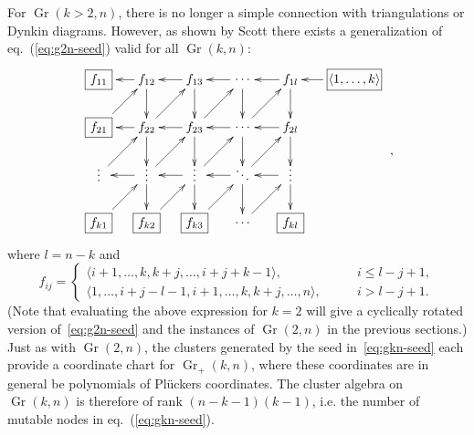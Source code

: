 \documentclass[11pt]{article}
\DeclareMathOperator{\Gr}{Gr}
\def\ket#1{\langle #1 \rangle}
\begin{document}
For $\Gr(k>2,n)$, there is no longer a simple connection with triangulations or Dynkin diagrams. However, as shown by Scott \cite{1088.22009} there exists a generalization of eq.~(\ref{eq:g2n-seed}) valid for all $\Gr(k,n)$:
\begin{equation}\label{eq:gkn-seed}
\begin{gathered}
\begin{xy} 0;<-.5pt,0pt>:<0pt,-.5pt>::
	(-100,0) *+{\framebox[10ex]{$\ket{1,\ldots,k}$}} ="-1",
	(0,0) *+{f_{1l}} ="0",
	(75,0) *+{\color{white} f_{00}} ="1",
	(150,0) *+{f_{13}} ="2",
	(225,0) *+{f_{12}} ="3",
	(300,0) *+{\framebox[5ex]{$f_{11}$}} ="4",
	(0,75) *+{f_{2l}} ="5",
	(75,75) *+{\color{white} f_{00}} ="6",
	(150,75) *+{f_{23}} ="7",
	(225,75) *+{f_{22}} ="8",
	(300,75) *+{\framebox[5ex]{$f_{21}$}} ="9",
	(0,150) *+{\color{white} f_{00}} ="10",
	(75,150) *+{\color{white} f_{00}} ="11",
	(150,150) *+{\color{white} f_{00}} ="12",
	(225,150) *+{\color{white} f_{00}} ="13",
	(300,150) *+{\color{white} f_{00}} ="14",
	(0,225) *+{\framebox[5ex]{$f_{kl}$}} ="15",
	(75,225) *+{\color{white} f_{00}} ="16",
	(150,225) *+{\framebox[5ex]{$f_{k3}$}} ="17",
	(225,225) *+{\framebox[5ex]{$f_{k2}$}} ="18",
	(300,225) *+{\framebox[5ex]{$f_{k1}$}} ="19",
	(75,0) *+{\cdots} ="01",
	(75,75) *+{\cdots} ="06",
	(0,144) *+{\vdots} ="010",
	(75,144) *+{\ddots} ="011",
	(150,144) *+{\vdots} ="012",
	(225,144) *+{\vdots} ="013",
	(300,144) *+{\vdots} ="014",
	(75,225) *+{\cdots} ="016",
	"-1", {\ar"0"},
	"0", {\ar"1"},
	"0", {\ar"5"},
	"6", {\ar"0"},
	"1", {\ar"2"},
	"2", {\ar"3"},
	"2", {\ar"7"},
	"8", {\ar"2"},
	"3", {\ar"4"},
	"3", {\ar"8"},
	"9", {\ar"3"},
	"5", {\ar"6"},
	"6", {\ar"7"},
	"7", {\ar"8"},
	"8", {\ar"9"},
	"13", {\ar"7"},
	"7", {\ar"12"},
	"8", {\ar"13"},
	"5", {\ar"10"},
	"14", {\ar"8"},
	"10", {\ar"15"},
	"12", {\ar"17"},
	"19", {\ar"13"},
	"18", {\ar"12"},
	"13", {\ar"18"},
	"17", {\ar"11"},
	"16", {\ar"10"},
	"13", {\ar"14"},
	"12", {\ar"13"},
	"11", {\ar"12"},
	"10", {\ar"11"},
	"7", {\ar"1"},
	"11", {\ar"5"},
	"12", {\ar"6"},
	"1", {\ar"6"},
	"6", {\ar"11"},
	"11", {\ar"16"},
\end{xy}
\end{gathered} \ ,
\end{equation}
where $l=n-k$ and 
\begin{equation}
  f_{i j} =
  \begin{cases}
    \langle i+1, \dotsc, k, k+j, \dotsc, i+j+k-1\rangle, \qquad &i \leq l-j+1,\\
    \langle 1, \dotsc, i+j-l-1, i+1, \dotsc, k, k+j, \dotsc, n\rangle, \qquad &i >l-j+1.
  \end{cases}
\end{equation}
(Note that evaluating the above expression for $k=2$ will give a cyclically rotated version of~\eqref{eq:g2n-seed} and the instances of $\Gr(2,n)$ in the previous sections.) Just as with $\Gr(2,n)$, the clusters generated by the seed in~\eqref{eq:gkn-seed} each provide a coordinate chart for $\Gr_+(k,n)$, where these coordinates are in general be polynomials of Pl\"uckers coordinates. The cluster algebra on $\Gr(k,n)$ is therefore of rank $(n-k-1)(k-1)$, i.e. the number of mutable nodes in eq.~(\ref{eq:gkn-seed}). 
\end{document}
